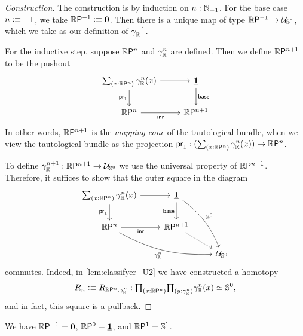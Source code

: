 \begin{proof}[Construction]
The construction is by induction on $n:\N_{-1}$.
For the base case $n\defeq -1$, 
we take $\rprojective{-1}\defeq\emptyt$. 
Then there is a unique map of type $\rprojective{-1}\to \UU_{\sphere{0}}$, which we
take as our definition of $\tautfam[\R]{-1}$.

For the inductive step, suppose $\rprojective{n}$ and $\tautfam[\R]{n}$ are defined. Then we define $\rprojective{n+1}$ to be the pushout
\begin{equation*}
\begin{tikzcd}
{\sm{x:\rprojective{n}}\tautfam[\R]{n}(x)} \arrow[d,swap,"\proj 1"] \arrow[r] & \unit \arrow[d,"\base"] \\
\rprojective{n} \arrow[r,swap,"\inr"] & \rprojective{n+1}
\end{tikzcd}
\end{equation*}
In other words, 
$\rprojective{n+1}$ is the \emph{mapping cone} of the tautological bundle, 
when we view the tautological bundle as the projection 
$\proj 1:(\sm{x:\rprojective{n}}\tautfam[\R]{n}(x))\to\rprojective{n}$. 

To define $\tautfam[\R]{n+1}:\rprojective{n+1}\to \UU_{\sphere{0}}$
we use the universal property of $\rprojective{n+1}$. 
Therefore, it suffices to show that the outer square in the diagram
\begin{equation}\label{eq:diagram}
\begin{tikzcd}
{\sm{x:\rprojective{n}}\tautfam[\R]{n}(x)} \arrow[d,swap,"\proj 1"] \arrow[r] & \unit \arrow[d,swap,"\base"] \arrow[ddr,bend left=15,"\sphere{0}"]\\
\rprojective{n} \arrow[drr,bend right=15,swap,"{\tautfam[\R]{n}}"] \arrow[r,swap,"\inr"] & \rprojective{n+1} \arrow[dr,densely dotted] \\
& & \UU_{\sphere{0}}
\end{tikzcd}
\end{equation}
commutes. Indeed, in \autoref{lem:classifyer_U2} we have constructed a homotopy 
\begin{equation*}
R_n\defeq R_{\rprojective{n},\tautfam[\R]{n}}:\prd{x:\rprojective{n}}{y:\tautfam[\R]{n}} \eqv{\tautfam[\R]{n}(x)}{\sphere{0}},
\end{equation*}
and in fact, this square is a pullback.
\end{proof}

\begin{eg}
We have $\rprojective{-1}=\emptyt$, $\rprojective{0}=\unit$, and $\rprojective{1}=\sphere{1}$. 
\end{eg}


